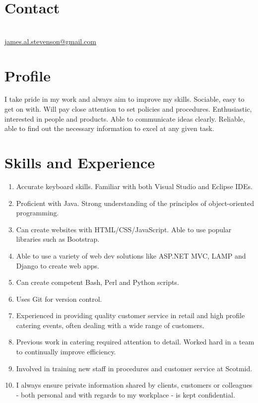 \documentclass[12pt, a4paper]{article}
\begin{document}
\par{\bigskip\par}

\section{Contact}

\large{}\\
\href{mailto:james.al.stevenson@gmail.com}{james.al.stevenson@gmail.com}


\section{Profile}

\large{I take pride in my work and always aim to improve my skills.  
Sociable, easy to get on with.
Will pay close attention to set policies and procedures. 
Enthusiastic, interested in people and products. 
Able to communicate ideas clearly. 
Reliable, able to find out the necessary information to excel at any given task.}

\section{Skills and Experience}


\begin{enumerate}
	\item Accurate keyboard skills. Familiar with both Visual Studio and Eclipse IDEs.
	\item Proficient with Java. Strong understanding of the principles of object-oriented programming. 
	\item Can create websites with HTML/CSS/JavaScript. Able to use popular libraries such as Bootstrap.
	\item Able to use a variety of web dev solutions like ASP.NET MVC, LAMP and Django to create web apps.
        \item Can create competent Bash, Perl and Python scripts.
	\item Uses Git for version control.
	\item Experienced in providing quality customer service in retail and high profile catering events, often dealing with a wide range of customers.
	\item Previous work in catering required attention to detail. Worked hard in a team to continually improve efficiency.
	\item Involved in training new staff in procedures and customer service at Scotmid.
	\item I always ensure private information shared by clients, customers or colleagues - both personal and with regards to my workplace - is kept confidential.
\end{enumerate}
\end{document}
